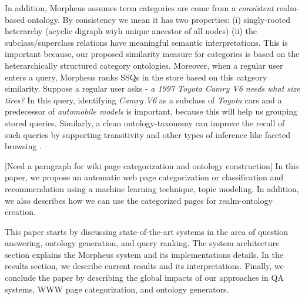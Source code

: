In addition, Morpheus assumes term categories are come from a
\textit{consistent} realm-based ontology. By consistency we mean it has two
properties: (i) singly-rooted heterarchy (acyclic digraph wiyh unique 
ancestor of all nodes) (ii) the subclass/superclass relations have meaningful 
semantic interpretations. This is important because, our proposed similarity 
measure for categories is based on the heterarchically
structured category ontologies. Moreover, when a regular user enters a query,
Morpheus ranks SSQs in the store based on this catgeory similarity. Suppose a
regular user asks -\textit{ a 1997 Toyota Camry V6 needs what size tires?} In
this query, identifying \textit{Camry V6} as a subclass of \textit{Toyota} cars
and a predecessor of \textit{automobile models} is important, because this will
help us grouping stored queries. Similarly, a clean ontology-taxonomy can
improve the recall of such queries by supporting transitivity and other types of
inference like faceted browsing \cite{Wu2008}.   

[Need a paragraph for wiki page categorization and ontology construction]
In this paper, we propose an automatic web page categorization or 
classification and recommendation using a machine learning technique, topic modeling.
In addition, we also describes how we can use the categorized pages for realm-ontology 
creation.   

This paper starts by discussing state-of-the-art systems in the area of
question answering, ontology generation, and query ranking. The system
architecture section explains the Morpheus system and its implementations
details. In the results section, we describe current results and its
interpretations. Finally, we conclude the paper by describing the global impacts
of our approaches in QA systems, WWW page categorization, and ontology
generators.
